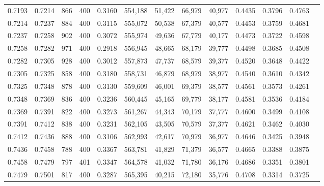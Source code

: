 \begin{tabular}{rrrrrrrrrrrrr}
0.7193 & 0.7214 &    866 &   400 &                                     0.3160 & 554,188 &  51,422 &  66,979 &  40,977 & 0.4435 & 0.3796 & 0.4763 \\
0.7214 & 0.7237 &    884 &   400 &                                     0.3115 & 555,072 &  50,538 &  67,379 &  40,577 & 0.4453 & 0.3759 & 0.4681 \\
0.7237 & 0.7258 &    902 &   400 &                                     0.3072 & 555,974 &  49,636 &  67,779 &  40,177 & 0.4473 & 0.3722 & 0.4598 \\
0.7258 & 0.7282 &    971 &   400 &                                     0.2918 & 556,945 &  48,665 &  68,179 &  39,777 & 0.4498 & 0.3685 & 0.4508 \\
0.7282 & 0.7305 &    928 &   400 &                                     0.3012 & 557,873 &  47,737 &  68,579 &  39,377 & 0.4520 & 0.3648 & 0.4422 \\
0.7305 & 0.7325 &    858 &   400 &                                     0.3180 & 558,731 &  46,879 &  68,979 &  38,977 & 0.4540 & 0.3610 & 0.4342 \\
0.7325 & 0.7348 &    878 &   400 &                                     0.3130 & 559,609 &  46,001 &  69,379 &  38,577 & 0.4561 & 0.3573 & 0.4261 \\
0.7348 & 0.7369 &    836 &   400 &                                     0.3236 & 560,445 &  45,165 &  69,779 &  38,177 & 0.4581 & 0.3536 & 0.4184 \\
0.7369 & 0.7391 &    822 &   400 &                                     0.3273 & 561,267 &  44,343 &  70,179 &  37,777 & 0.4600 & 0.3499 & 0.4108 \\
0.7391 & 0.7412 &    838 &   400 &                                     0.3231 & 562,105 &  43,505 &  70,579 &  37,377 & 0.4621 & 0.3462 & 0.4030 \\
0.7412 & 0.7436 &    888 &   400 &                                     0.3106 & 562,993 &  42,617 &  70,979 &  36,977 & 0.4646 & 0.3425 & 0.3948 \\
0.7436 & 0.7458 &    788 &   400 &                                     0.3367 & 563,781 &  41,829 &  71,379 &  36,577 & 0.4665 & 0.3388 & 0.3875 \\
0.7458 & 0.7479 &    797 &   401 &                                     0.3347 & 564,578 &  41,032 &  71,780 &  36,176 & 0.4686 & 0.3351 & 0.3801 \\
0.7479 & 0.7501 &    817 &   400 &                                     0.3287 & 565,395 &  40,215 &  72,180 &  35,776 & 0.4708 & 0.3314 & 0.3725 \\

\end{tabular}
